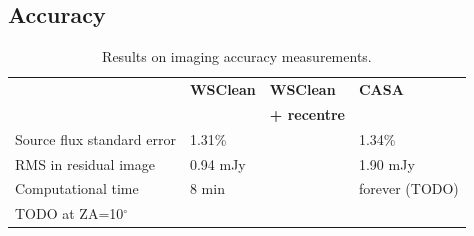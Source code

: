 \documentclass[useAMS,usenatbib]{mn2e}
\newcommand{\degree}{\ensuremath{^{\circ}}\xspace}
\begin{document}
\subsection{Accuracy}
\begin{table}%
\caption{Results on imaging accuracy measurements.} \label{tbl:accuracy-measurements}%
\begin{center}\begin{tabular}{llll}%
\hline\hline
& \textbf{WSClean} & \textbf{WSClean}    & \textbf{CASA} \\
&                  & \textbf{+ recentre} & \\
\hline
Source flux standard error & 1.31\% & & 1.34\% \\
RMS in residual image & 0.94 mJy & & 1.90 mJy \\
Computational time & 8 min & & forever (TODO) \\
TODO at ZA=10\degree & & \\
\hline\hline
\end{tabular}\end{center}\end{table}
\end{document}
